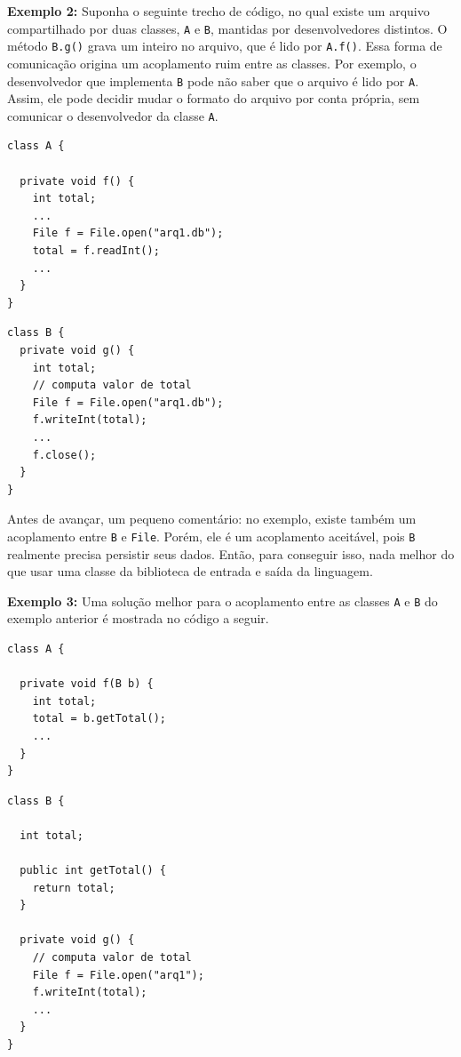 \documentclass[
  11pt,
  twoside]{book}
\newcommand{\passthrough}[1]{#1}
\begin{document}
\textbf{Exemplo 2:} Suponha o seguinte trecho de código, no qual existe
um arquivo compartilhado por duas classes, \passthrough{\lstinline!A!} e
\passthrough{\lstinline!B!}, mantidas por desenvolvedores distintos. O
método \passthrough{\lstinline!B.g()!} grava um inteiro no arquivo, que
é lido por \passthrough{\lstinline!A.f()!}. Essa forma de comunicação
origina um acoplamento ruim entre as classes. Por exemplo, o
desenvolvedor que implementa \passthrough{\lstinline!B!} pode não saber
que o arquivo é lido por \passthrough{\lstinline!A!}. Assim, ele pode
decidir mudar o formato do arquivo por conta própria, sem comunicar o
desenvolvedor da classe \passthrough{\lstinline!A!}.

\begin{lstlisting}
class A {

  private void f() {
    int total;
    ...
    File f = File.open("arq1.db");
    total = f.readInt();
    ...
  }
}
\end{lstlisting}

\begin{lstlisting}
class B {
  private void g() {
    int total;
    // computa valor de total
    File f = File.open("arq1.db");
    f.writeInt(total);
    ...
    f.close();
  }
}
\end{lstlisting}

Antes de avançar, um pequeno comentário: no exemplo, existe também um
acoplamento entre \passthrough{\lstinline!B!} e
\passthrough{\lstinline!File!}. Porém, ele é um acoplamento aceitável,
pois \passthrough{\lstinline!B!} realmente precisa persistir seus dados.
Então, para conseguir isso, nada melhor do que usar uma classe da
biblioteca de entrada e saída da linguagem.

\textbf{Exemplo 3:} Uma solução melhor para o acoplamento entre as
classes \passthrough{\lstinline!A!} e \passthrough{\lstinline!B!} do
exemplo anterior é mostrada no código a seguir.

\begin{lstlisting}
class A {

  private void f(B b) {
    int total;
    total = b.getTotal();
    ...
  }
}
\end{lstlisting}

\begin{lstlisting}
class B {

  int total;

  public int getTotal() {
    return total;
  }

  private void g() {
    // computa valor de total
    File f = File.open("arq1");
    f.writeInt(total);
    ...
  }
}
\end{lstlisting}
\end{document}
